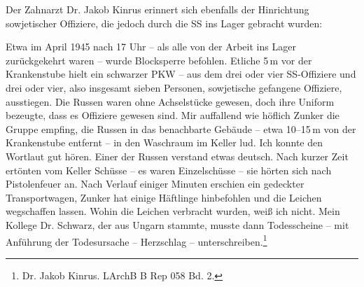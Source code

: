 Der Zahnarzt Dr. Jakob Kinrus erinnert sich ebenfalls der Hinrichtung sowjetischer Offiziere, die jedoch durch die SS ins Lager gebracht wurden:
\begin{leftbar}
Etwa im April 1945 nach 17 Uhr -- als alle von der Arbeit ins Lager zurückgekehrt waren -- wurde Blocksperre befohlen. Etliche 5\,m vor der Krankenstube hielt ein schwarzer PKW -- aus dem drei oder vier SS-Offiziere und drei oder vier, also insgesamt sieben Personen, sowjetische gefangene Offiziere, ausstiegen. Die Russen waren ohne Achselstücke gewesen, doch ihre Uniform bezeugte, dass es Offiziere gewesen sind. Mir auffallend wie höflich Zunker die Gruppe empfing, die Russen in das benachbarte Gebäude -- etwa 10--15\,m von der Krankenstube entfernt -- in den Waschraum im Keller lud. Ich konnte den Wortlaut gut hören. Einer der Russen verstand etwas deutsch. Nach kurzer Zeit ertönten vom Keller Schüsse -- es waren Einzelschüsse -- sie hörten sich nach Pistolenfeuer an. Nach Verlauf einiger Minuten erschien ein gedeckter Transportwagen, Zunker hat einige Häftlinge hinbefohlen und die Leichen wegschaffen lassen. Wohin die Leichen verbracht wurden, weiß ich nicht. Mein Kollege Dr. Schwarz, der aus Ungarn stammte, musste dann Todesscheine -- mit Anführung der Todesursache -- Herzschlag -- unterschreiben.\footnote{Dr. Jakob Kinrus. LArchB B Rep 058 Bd. 2.}
\end{leftbar}

